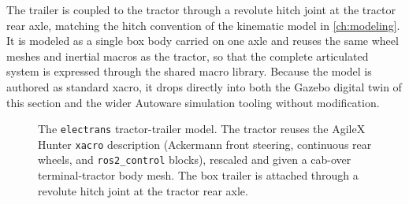 The trailer is coupled to the tractor through a revolute hitch joint at the tractor rear axle, matching the hitch convention of the kinematic model in \cref{ch:modeling}. It is modeled as a single box body carried on one axle and reuses the same wheel meshes and inertial macros as the tractor, so that the complete articulated system is expressed through the shared macro library. Because the model is authored as standard xacro, it drops directly into both the Gazebo digital twin of this section and the wider Autoware simulation tooling without modification.

\begin{figure}[H]
    \centering
    \caption{The \texttt{electrans} tractor-trailer model. The tractor reuses the AgileX Hunter \texttt{xacro} description (Ackermann front steering, continuous rear wheels, and \texttt{ros2\_control} blocks), rescaled and given a cab-over terminal-tractor body mesh. The box trailer is attached through a revolute hitch joint at the tractor rear axle.}
    \label{fig:electrans_model}
\end{figure}
